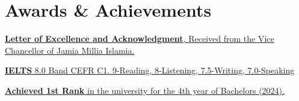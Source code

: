 \section{Awards \& Achievements}
 \begin{itemize}[leftmargin=0.0in, label={}]
    \small{\item{

    \vspace{1pt}
    \textbf{\normalsize{}}{\normalsize \href{https://drive.google.com/file/d/11KpbP_f7_s7xUv2yD2q7XwloCsltZxVZ/view}{\textbf{Letter of Excellence and Acknowledgment}, Received from the Vice Chancellor of Jamia Millia Islamia.}} 
    
    \textbf{\normalsize{}}{ \normalsize \href{https://drive.google.com/file/d/1Vls-iQqAV_Z84gk2UmDiO7xGHLenIl20/view}{\textbf{IELTS} 8.0 Band CEFR C1. 9-Reading, 8-Listening, 7.5-Writing, 7.0-Speaking}} 
    
     \vspace{1pt}
    \textbf{\normalsize{}}{ \normalsize \href{https://drive.google.com/file/d/11KpbP_f7_s7xUv2yD2q7XwloCsltZxVZ/view}{\textbf{Achieved 1st Rank} in the university for the 4th year of Bachelors (2024).}} 
    }}
 \end{itemize}
